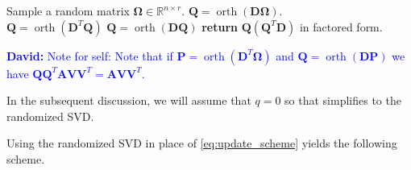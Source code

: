 \documentclass[11pt]{article}
\DeclareMathOperator{\orth}{orth}
\newcommand{\David}[1]{\textcolor{blue}{\textbf{David:} #1}}
\begin{document}
\begin{algorithm}[H]%
    \caption{Subspace iteration}
    \label{alg:subspaceiteration}
    \begin{algorithmic}[1]
    \State Sample a random matrix $\bm{\Omega} \in \mathbb{R}^{n \times r}$.
    \State $\bm{Q} = \orth(\bm{D}\bm{\Omega})$.\\
    {
     $\bm{Q} = \orth(\bm{D}^T \bm{Q})$\;
     $\bm{Q} = \orth(\bm{D} \bm{Q})$
    }
    \State \textbf{return} $\bm{Q} (\bm{Q}^T \bm{D})$ in factored form.
    \end{algorithmic}
\end{algorithm}
\David{Note for self: Note that if $\bm{P} = \orth(\bm{D}^T\bm{\Omega})$ and $\bm{Q} = \orth(\bm{D} \bm{P})$ we have $\bm{Q}\bm{Q}^T \bm{A}\bm{V} \bm{V}^T = \bm{A} \bm{V} \bm{V}^T$.}

In the subsequent discussion, we will assume that $q = 0$ so that  simplifies to the randomized SVD.

Using the randomized SVD in place of \eqref{eq:update_scheme} yields the following scheme. 
\end{document}
